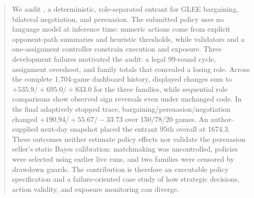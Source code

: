 \begin{abstract}
We audit \AgentName, a deterministic, role-separated entrant for GLEE
bargaining, bilateral negotiation, and persuasion. The submitted policy uses no
language model at inference time: numeric actions come from explicit
opponent-path summaries and heuristic thresholds, while validators and a
one-assignment controller constrain execution and exposure. Three development
failures motivated the audit: a legal 99-round cycle, assignment overshoot, and
family totals that concealed a losing role. Across the complete 1,704-game
dashboard history, displayed changes sum to $+535.9/+695.0/+833.0$ for the
three families, while sequential role comparisons show observed sign reversals
even under unchanged code. In the final adaptively stopped trace,
bargaining/persuasion/negotiation changed $+190.94/+55.67/-33.73$ over
150/78/20 games.
An author-supplied next-day snapshot placed the entrant 95th overall at 1674.3.
These outcomes neither estimate policy effects nor validate the persuasion
seller's static Bayes calibration: matchmaking was uncontrolled, policies were
selected using earlier live runs, and two families were censored by drawdown
guards. The contribution is therefore an executable policy specification and a
failure-oriented case study of how strategic decisions, action validity, and
exposure monitoring can diverge.
\end{abstract}
